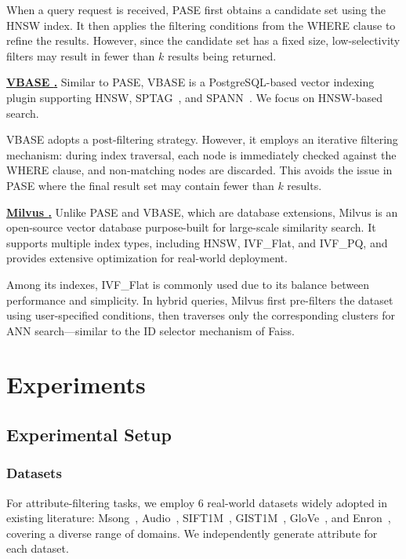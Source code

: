 \documentclass[sigconf, nonacm]{acmart}
\begin{document}
	When a query request is received, PASE first obtains a candidate set using the HNSW index. It then applies the filtering conditions from the WHERE clause to refine the results. However, since the candidate set has a fixed size, low-selectivity filters may result in fewer than $k$ results being returned.
	
	
	\noindent\textbf{\underline{VBASE \cite{vbase}.}}  
	Similar to PASE, VBASE is a PostgreSQL-based vector indexing plugin supporting HNSW, SPTAG~\cite{sptag}, and SPANN~\cite{spann}. We focus on HNSW-based search.
	
	VBASE adopts a post-filtering strategy. However, it employs an iterative filtering mechanism: during index traversal, each node is immediately checked against the WHERE clause, and non-matching nodes are discarded. This avoids the issue in PASE where the final result set may contain fewer than $k$ results.
	
	
	\noindent\textbf{\underline{Milvus \cite{milvus}.}}  
	Unlike PASE and VBASE, which are database extensions, Milvus is an open-source vector database purpose-built for large-scale similarity search. It supports multiple index types, including HNSW, IVF\_Flat, and IVF\_PQ, and provides extensive optimization for real-world deployment.
	
	Among its indexes, IVF\_Flat is commonly used due to its balance between performance and simplicity. In hybrid queries, Milvus first pre-filters the dataset using user-specified conditions, then traverses only the corresponding clusters for ANN search—similar to the ID selector mechanism of Faiss.
	
	\section{Experiments}
	\subsection{Experimental Setup}
	\subsubsection{Datasets}
	
	For attribute-filtering tasks, we employ 6 real-world datasets widely adopted in existing literature: Msong~\cite{msong2011}, Audio~\cite{audio_unknown}, SIFT1M~\cite{sift2010}, GIST1M~\cite{sift2010}, GloVe~\cite{GloVe2015}, and Enron~\cite{enron2015}, covering a diverse range of domains. We independently generate attribute for each dataset.
	
\end{document}

